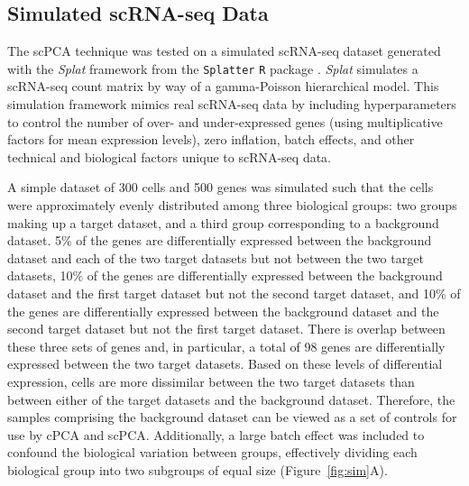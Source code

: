 
\subsection{Simulated scRNA-seq Data}\label{sim_scRNA-seq}

The scPCA technique was tested on a simulated scRNA-seq dataset generated with the \textit{Splat} framework from the \texttt{Splatter} \texttt{R} package  \cite{Zappia2017}. \textit{Splat} simulates a scRNA-seq count matrix by way of a gamma-Poisson hierarchical model. This simulation framework mimics real scRNA-seq data by including hyperparameters to control the number of over- and under-expressed genes (using multiplicative factors for mean expression levels), zero inflation, batch effects, and other technical and biological factors unique to scRNA-seq data.

A simple dataset of 300 cells and 500 genes was simulated such that the cells were approximately evenly distributed among three biological groups: two groups making up a target dataset, and a third group corresponding to a background dataset. 5\% of the genes are differentially expressed between the background dataset and each of the two target datasets but not between the two target datasets, 10\% of the genes are differentially expressed between the background dataset and the first target dataset but not the second target dataset, and 10\% of the genes are differentially expressed between the background dataset and the second target dataset but not the first target dataset. There is overlap between these three sets of genes and, in particular, a total of 98 genes are differentially expressed between the two target datasets. Based on these levels of differential expression, cells are more dissimilar between the two target datasets than between either of the target datasets and the background dataset. Therefore, the samples comprising the background dataset can be viewed as a set of controls for use by cPCA and scPCA. Additionally, a large batch effect was included to confound the biological variation between groups, effectively dividing each biological group into two subgroups of equal size (Figure~\ref{fig:sim}A).

